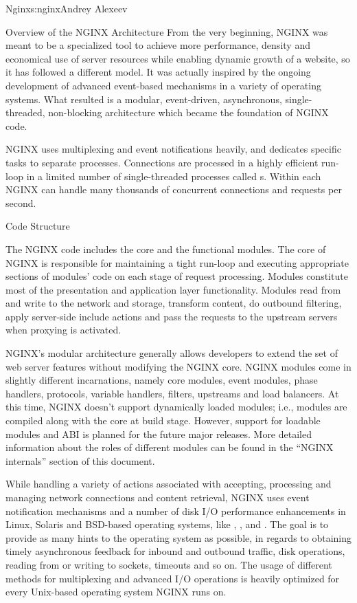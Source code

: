 \begin{aosachapter}{Nginx}{s:nginx}{Andrey Alexeev}
\begin{aosasect1}{Overview of the NGINX Architecture}
From the very beginning, NGINX was meant to be a specialized tool to
achieve more performance, density and economical use of server
resources while enabling dynamic growth of a website, so it has
followed a different model. It was actually inspired by the ongoing
development of advanced event-based mechanisms in a variety of
operating systems. What resulted is a modular, event-driven,
asynchronous, single-threaded, non-blocking architecture which became
the foundation of NGINX code.

NGINX uses multiplexing and event notifications heavily, and dedicates
specific tasks to separate processes. Connections are processed in a
highly efficient run-loop in a limited number of single-threaded
processes called s. Within each  NGINX can
handle many thousands of concurrent connections and requests per
second.

\begin{aosasect2}{Code Structure}

The NGINX  code includes the core and the functional
modules. The core of NGINX is responsible for maintaining a tight
run-loop and executing appropriate sections of modules' code on each
stage of request processing. Modules constitute most of the
presentation and application layer functionality. Modules read from
and write to the network and storage, transform content, do outbound
filtering, apply server-side include actions and pass the requests to
the upstream servers when proxying is activated.

NGINX's modular architecture generally allows developers to extend the
set of web server features without modifying the NGINX core. NGINX
modules come in slightly different incarnations, namely core modules,
event modules, phase handlers, protocols, variable handlers, filters,
upstreams and load balancers. At this time, NGINX doesn't support
dynamically loaded modules; i.e., modules are compiled along with the
core at build stage. However, support for loadable modules and ABI is
planned for the future major releases. More detailed information about
the roles of different modules can be found in the ``NGINX internals''
section of this document.


While handling a variety of actions associated with accepting,
processing and managing network connections and content retrieval,
NGINX uses event notification mechanisms and a number of disk I/O
performance enhancements in Linux, Solaris and BSD-based operating
systems, like , , and . The
goal is to provide as many hints to the operating system as possible,
in regards to obtaining timely asynchronous feedback for inbound and
outbound traffic, disk operations, reading from or writing to sockets,
timeouts and so on. The usage of different methods for multiplexing
and advanced I/O operations is heavily optimized for every Unix-based
operating system NGINX runs on.


\end{aosasect2}
\end{aosasect1}
\end{aosachapter}
